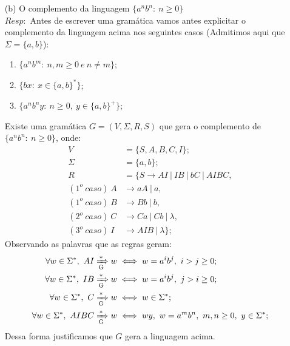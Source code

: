 \documentclass{homework}
\begin{document}
\pagestyle{fancy}

	\begin{itemize}
		\item[(b)] O complemento da linguagem $\{a^n b^n:\ n \geq 0\}$\\
		$Resp:$ Antes de escrever uma gramática vamos antes explicitar o complemento da linguagem acima nos seguintes casos (Admitimos aqui que $\Sigma = \{a,b\}$):
		\begin{enumerate}
			\item $\{a^n b^m:\ n,m \geq 0\ e\ n \neq m\}$;
			\item $\{b x:\ x \in \{a,b\}^*\}$;
			\item $\{a^n b^n y:\ n \geq 0,\ y \in \{a,b\}^+\}$;
		\end{enumerate}		 Existe uma gramática $G = (V, \Sigma, R, S)$ que gera o complemento de $\{a^n b^n:\ n \geq 0\}$, onde: %
		\begin{align*}
			V &= \{S, A, B, C, I\};\\
			\Sigma &= \{a,b\};\\
			R &= \{S \rightarrow AI\ |\ IB\ |\ bC\ |\ AIBC,\\
			(1^o\ caso)\ A & \rightarrow aA\ |\ a,\\
			(1^o\ caso)\ B & \rightarrow Bb\ |\ b,\\
			(2^o\ caso)\ C & \rightarrow Ca\ |\ Cb\ |\ \lambda,\\
			(3^o\ caso)\ I & \rightarrow AIB\ |\ \lambda\};
		\end{align*}
		Observando as palavras que as regras geram:
		\begin{align*}
			\forall w \in \Sigma^*,\  AI & \xRightarrow[\text{G}]{*} w \iff w = a^i b^j,\ i > j\geq 0;\\
			\forall w \in \Sigma^*,\  IB & \xRightarrow[\text{G}]{*} w \iff w = a^i b^j,\ j > i \geq 0;\\
			\forall w \in \Sigma^*,\  C & \xRightarrow[\text{G}]{*} w \iff w \in \Sigma^*;\\
			\forall w \in \Sigma^*,\  AIBC & \xRightarrow[\text{G}]{*} w \iff wy,\ w = a^m b^n,\ m,n \geq 0,\ y \in \Sigma^*;
		\end{align*}
		Dessa forma justificamos que $G$ gera a linguagem acima.


\end{itemize}
\end{document}
